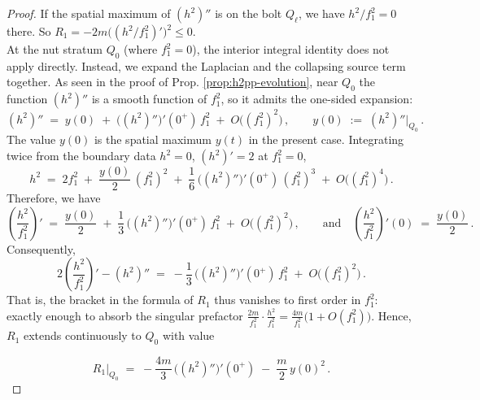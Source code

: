 \documentclass[11pt]{amsart}
\theoremstyle{plain}
\numberwithin{equation}{section}
\theoremstyle{definition}
\theoremstyle{remark}
\begin{document}
\begin{proof}
If the spatial maximum of $(h^2)''$ is on the bolt $Q_\ell$, we have $h^2/f_1^2 = 0$ there. So $R_1 = - 2 m \big( ( h^2 / f_1^2 )' \big)^2 \leq 0$.\\

	At the nut stratum $Q_0$ (where $f_1^2 = 0$), the interior integral identity does not apply directly. Instead, we expand the Laplacian and the collapsing source term together. %
	As seen in the proof of Prop. \ref{prop:h2pp-evolution}, near $Q_0$ the function $( h^2 )''$ is a smooth function of $f_1^2$, so it admits the one-sided expansion:	
	\[
	( h^2 )'' \;=\; y (0) \;+\; \big( ( h^2 )'' \big)' ( 0^+ )\, f_1^2 \;+\; O \big( ( f_1^2 )^2 \big) \,, \qquad y (0) \;:=\; ( h^2 )'' \big|_{Q_0} \,.
	\]
	The value $y (0)$ is the spatial maximum $y (t)$ in the present case. Integrating twice from the boundary data $h^2 = 0$, $( h^2 )' = 2$ at $f_1^2 = 0$,
	\[
	h^2 \;=\; 2 f_1^2 \;+\; \frac{y (0)}{2}\, ( f_1^2 )^2 \;+\; \frac{1}{6}\, \big( ( h^2 )'' \big)' ( 0^+ )\, ( f_1^2 )^3 \;+\; O \big( ( f_1^2 )^4 \big) \,.
	\]
	Therefore, we have	
	\[
	\left( \frac{h^2}{f_1^2} \right)' \;=\; \frac{y (0)}{2} \;+\; \frac{1}{3}\, \big( ( h^2 )'' \big)' ( 0^+ )\, f_1^2 \;+\; O \big( ( f_1^2 )^2 \big) \,, \qquad \text{and} \quad \left( \frac{h^2}{f_1^2} \right)' (0) \;=\; \frac{y (0)}{2} \,.
	\]	
	Consequently,	
	\[
	2 \left( \frac{h^2}{f_1^2} \right)' - ( h^2 )'' \;=\; - \frac{1}{3}\, \big( ( h^2 )'' \big)' ( 0^+ )\, f_1^2 \;+\; O \big( ( f_1^2 )^2 \big) \,.
	\]
	That is, the bracket in the formula of $R_1$ thus vanishes to {first order} in $f_1^2$: exactly enough to absorb the singular prefactor $\tfrac{2 m}{f_1^2} \cdot \tfrac{h^2}{f_1^2} = \tfrac{4 m}{f_1^2} \big( 1 + O ( f_1^2 ) \big)$. Hence, $R_1$ extends continuously to $Q_0$ with value
	
	\[
	R_1 \big|_{Q_0} \;=\; - \frac{4 m}{3}\, \big( ( h^2 )'' \big)' ( 0^+ ) \;-\; \frac{m}{2}\, y (0)^2 \,.
	\]
	
	

\end{proof}
\end{document}
